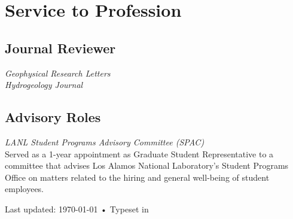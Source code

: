 \documentclass[11pt, letterpaper]{article}
\newcommand{\years}[1]{\marginnote{\scriptsize #1}}
\begin{document}
\section*{Service to Profession}

\subsection*{Journal Reviewer}
\setlength\multicolsep{0pt} %
\begin{multicols}{3}
	\textit{Geophysical Research Letters}\\
	\textit{Hydrogeology Journal}
\end{multicols}
\subsection*{Advisory Roles}\noindent

\years{2018 - 2019} \textit{LANL Student Programs Advisory Committee (SPAC)}\\
Served as a 1-year appointment as Graduate Student Representative to a committee that advises Los Alamos National Laboratory's Student Programs Office on matters related to the hiring and general well-being of student employees.



\vfill{}

\begin{center}
{\scriptsize  Last updated: \today\- •\- Typeset in \href{http://nitens.org/taraborelli/cvtex}{
\XeTeX }}
\end{center}
\end{document}
